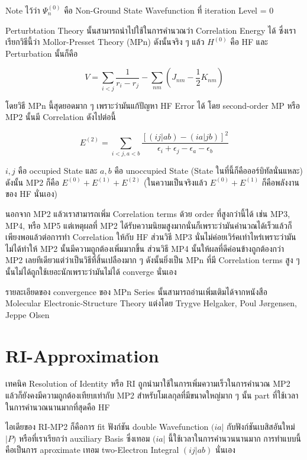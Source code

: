 Note ไว้ว่า $\Psi^{(0)}_{n}$ คือ Non-Ground State Wavefunction ที่ iteration Level = 0

Perturbtation Theory นั้นสามารถนำไปใช้ในการคำนวณว่า Correlation Energy ได้ ซึ่งเราเรียกวิธีนี้ว่า
Mollor-Presset Theory (MPn) ดังนั้นจริง ๆ แล้ว $H^{(0)}$ คือ HF และ Perturbation นั้นก็คือ

\begin{equation}
    V = \sum_{i < j} \frac{1}{r_{i} - r_{j}} - \sum_{nm} (J_{nm} - \frac{1}{2}K_{nm})
\end{equation}

โดยวิธี MPn นี้สุดยอดมาก ๆ เพราะว่ามันแก้ปัญหา HF Error ได้ โดย second-order MP หรือ MP2 นั้นมี
Correlation ดังไปต่อนี้

\begin{equation}
    E^{(2)} = \sum_{i<j,a<b} \frac{[(ij|ab) - (ia|jb)]^{2}}
    {\epsilon_{i} + \epsilon_{j} - \epsilon_{a} - \epsilon_{b}}
\end{equation}

\noindent $i,j$ คือ occupied State และ $a,b$ คือ unoccupied State (State ในที่นี้ก็คือออร์บิทัลนั่นแหละ)
ดังนั้น MP2 ก็คือ $E^{(0)} + E^{(1)} + E^{(2)}$ (ในความเป็นจริงแล้ว $E^{(0)} + E^{(1)}$ ก็คือพลังงานของ
HF นั่นเอง)

นอกจาก MP2 แล้วเราสามารถเพิ่ม Correlation terms ด้วย order ที่สูงกว่านี้ได้ เช่น MP3, MP4, หรือ MP5
แต่เหตุผลที่ MP2 ได้รับความนิยมสูงมากนั่นก็เพราะว่ามันคำนวณได้เร็วแล้วก็เพียงพอแล้วต่อการทำ Correlation
ให้กับ HF ส่วนวิธี MP3 นั่นไม่ค่อยเวิร์คเท่าไหร่เพราะว่ามันไม่ได้ทำให้ MP2 นั้นมีความถูกต้องเพิ่มมากขึ้น ส่วนวิธี MP4
นั้นให้ผลที่ดีค่อนข้างถูกต้องกว่า MP2 เลยทีเดียวแต่ว่าเป็นวิธีที่สิ้นเปลืองมาก ๆ ดังนั้นยิ่งเป็น MPn ที่มี Correlation terms
สูง ๆ นั้นไม่ได้ถูกใช้เยอะนักเพราะว่ามันไม่ได้ converge นั่นเอง

รายละเอียดของ convergence ของ MPn Series นั้นสามารถอ่านเพิ่มเติมได้จากหนังสือ
Molecular Electronic-Structure Theory แต่งโดย Trygve Helgaker, Poul Jørgensen, Jeppe Olsen

\section{RI-Approximation}

เทคนิค Resolution of Identity หรือ RI ถูกนำมาใช้ในการเพิ่มความเร็วในการคำนวณ MP2
แล้วก็ยังคงมีความถูกต้องเทียบเท่ากับ MP2 สำหรับโมเลกุลที่มีขนาดใหญ่มาก ๆ นั้น part ที่ใช้เวลาในการคำนวณนานมากที่สุดคือ
HF

ไอเดียของ RI-MP2 ก็คือการ fit ฟังก์ชัน double Wavefunction $(ia|$ กับฟังก์ชันเบสิสอันใหม่ $|P)$ หรือที่เราเรียกว่า
auxiliary Basis ซึ่งเทอม $(ia|$ นี้ใช้เวลาในการคำนวนนานมาก การทำแบบนี้คือเป็นการ aproximate เทอม
two-Electron Integral $(ij|ab)$ นั่นเอง

